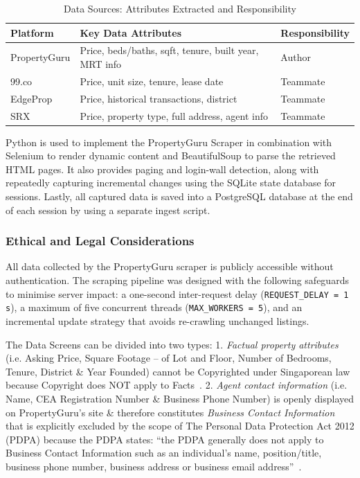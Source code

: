 \begin{table}[!ht]
    \centering
    \small
    \caption{Data Sources: Attributes Extracted and Responsibility}
    \label{tab:data_sources}
    \renewcommand{\arraystretch}{1.2}
    \begin{tabular}{@{}lll@{}}
    \toprule
    \textbf{Platform} & \textbf{Key Data Attributes} & \textbf{Responsibility} \\ \midrule
    PropertyGuru & Price, beds/baths, sqft, tenure, built year, MRT info & Author \\
    99.co        & Price, unit size, tenure, lease date                  & Teammate \\
    EdgeProp     & Price, historical transactions, district               & Teammate \\
    SRX          & Price, property type, full address, agent info         & Teammate \\
    \bottomrule
    \end{tabular}
\end{table}

Python is used to implement the PropertyGuru Scraper in combination with Selenium to render dynamic content and BeautifulSoup to parse the retrieved HTML pages. It also provides paging and login-wall detection, along with repeatedly capturing incremental changes using the SQLite state database for sessions. Lastly, all captured data is saved into a PostgreSQL database at the end of each session by using a separate ingest script.

\subsubsection{Ethical and Legal Considerations}
All data collected by the PropertyGuru scraper is publicly accessible without
authentication. The scraping pipeline was designed with the following safeguards
to minimise server impact: a one-second inter-request delay
(\texttt{REQUEST\_DELAY\,=\,1\,s}), a maximum of five concurrent threads
(\texttt{MAX\_WORKERS\,=\,5}), and an incremental update strategy that avoids
re-crawling unchanged listings.

The Data Screens can be divided into two types: 1. \textit{Factual property 
attributes} (i.e. Asking Price, Square Footage -- of Lot and Floor, Number of 
Bedrooms, Tenure, District \& Year Founded) cannot be Copyrighted under 
Singaporean law because Copyright does NOT apply to Facts~\cite{singapore_copyright_act}. 
2. \textit{Agent contact information} (i.e. Name, CEA Registration Number \& 
Business Phone Number) is openly displayed on PropertyGuru’s site \& therefore 
constitutes \textit{Business Contact Information} that is explicitly excluded 
by the scope of The Personal Data Protection Act 2012 (PDPA) because the PDPA 
states: ``the PDPA generally does not apply to Business Contact Information 
such as an individual's name, position/title, business phone number, business 
address or business email address''~\cite{pdpc_overview}.

